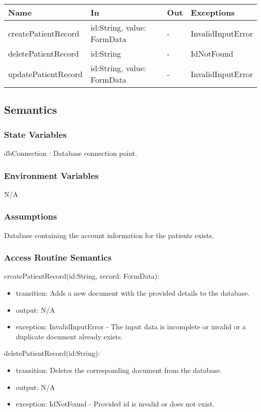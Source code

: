 \documentclass[12pt, titlepage]{article}
\begin{document}
\begin{center}
\begin{tabular}{p{4cm} p{4.5cm} p{1cm} p{2.5cm}}
\hline
\textbf{Name} & \textbf{In} & \textbf{Out} & \textbf{Exceptions} \\
\hline
createPatientRecord & id:String, value: FormData & - & InvalidInputError \\
deletePatientRecord & id:String & - & IdNotFound\\
updatePatientRecord & id:String, value: FormData & - & InvalidInputError \\
\hline
\end{tabular}
\end{center}

\subsection{Semantics}

\subsubsection{State Variables}
dbConnection : Database connection point.

\subsubsection{Environment Variables}
N/A

\subsubsection{Assumptions}
Database containing the account information for the patients exists.

\subsubsection{Access Routine Semantics}

\noindent createPatientRecord(id:String, record: FormData):
\begin{itemize}
\item transition: Adds a new document with the provided details to the database.
\item output: N/A
\item exception: InvalidInputError - The input data is incomplete or invalid or a duplicate document already exists.
\end{itemize}

\noindent deletePatientRecord(id:String):
\begin{itemize}
\item transition: Deletes the corresponding document from the database.
\item output: N/A
\item exception: IdNotFound - Provided id is invalid or does not exist.
\end{itemize}
\end{document}
